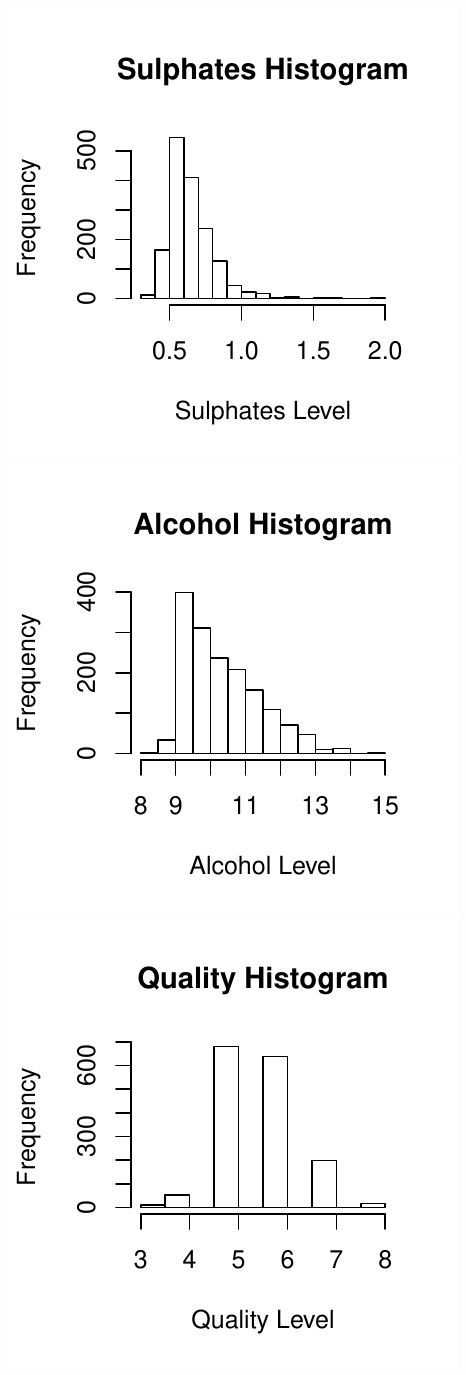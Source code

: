 \documentclass[]{article}
\begin{document}
\includegraphics{Project_files/figure-latex/unnamed-chunk-18-9.pdf}
\includegraphics{Project_files/figure-latex/unnamed-chunk-18-10.pdf}
\includegraphics{Project_files/figure-latex/unnamed-chunk-18-11.pdf}
\end{document}
